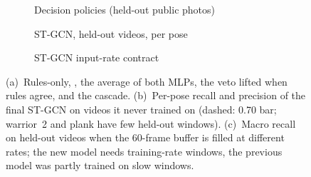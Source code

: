 \begin{figure}[t]
\centering
\begin{subfigure}[t]{0.32\textwidth}\centering\caption{Decision policies (held-out public photos)}\end{subfigure}\hfill
\begin{subfigure}[t]{0.32\textwidth}\centering\caption{ST-GCN, held-out videos, per pose}\end{subfigure}\hfill
\begin{subfigure}[t]{0.32\textwidth}\centering\caption{ST-GCN input-rate contract}\end{subfigure}
\caption{(a)~Rules-only, \vfour{}, the average of both MLPs, the veto lifted when rules agree, and the cascade. (b)~Per-pose recall and precision of the final ST-GCN on videos it never trained on (dashed: 0.70 bar; warrior~2 and plank have few held-out windows). (c)~Macro recall on held-out videos when the 60-frame buffer is filled at different rates; the new model needs training-rate windows, the previous model was partly trained on slow windows.}
\label{fig:charts}
\end{figure}

